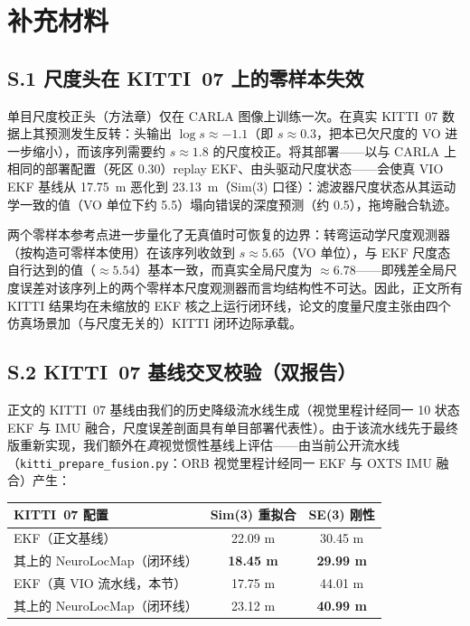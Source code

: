 
\section*{补充材料}
\label{sec:supplementary}

\subsection*{S.1 尺度头在 KITTI~07 上的零样本失效}

单目尺度校正头（方法章）仅在 CARLA 图像上训练一次。在真实 KITTI~07 数据上其预测发生反转：头输出 $\log s \approx -1.1$（即 $s\approx0.3$，把本已欠尺度的 VO 进一步缩小），而该序列需要约 $s\approx1.8$ 的尺度校正。将其部署——以与 CARLA 上相同的部署配置（死区 $0.30$）replay EKF、由头驱动尺度状态——会使真 VIO EKF 基线从 17.75~m 恶化到 23.13~m（Sim(3) 口径）：滤波器尺度状态从其运动学一致的值（VO 单位下约 5.5）塌向错误的深度预测（约 0.5），拖垮融合轨迹。

两个零样本参考点进一步量化了无真值时可恢复的边界：转弯运动学尺度观测器（按构造可零样本使用）在该序列收敛到 $s\approx5.65$（VO 单位），与 EKF 尺度态自行达到的值（$\approx5.54$）基本一致，而真实全局尺度为 $\approx6.78$——即残差全局尺度误差对该序列上的两个零样本尺度观测器而言均结构性不可达。因此，正文所有 KITTI 结果均在未缩放的 EKF 核之上运行闭环线，论文的度量尺度主张由四个仿真场景加（与尺度无关的）KITTI 闭环边际承载。

\subsection*{S.2 KITTI~07 基线交叉校验（双报告）}

正文的 KITTI~07 基线由我们的历史降级流水线生成（视觉里程计经同一 10 状态 EKF 与 IMU 融合，尺度误差剖面具有单目部署代表性）。由于该流水线先于最终版重新实现，我们额外在\emph{真}视觉惯性基线上评估——由当前公开流水线（\texttt{kitti\_prepare\_fusion.py}：ORB 视觉里程计经同一 EKF 与 OXTS IMU 融合）产生：

\begin{center}
\scriptsize
\setlength{\tabcolsep}{3.5pt}
\begin{tabular}{@{}lcc@{}}
\toprule
KITTI~07 配置 & Sim(3) 重拟合 & SE(3) 刚性 \\
\midrule
EKF（正文基线）          & 22.09 m & 30.45 m \\
其上的 NeuroLocMap（闭环线）     & \textbf{18.45 m} & \textbf{29.99 m} \\
\midrule
EKF（真 VIO 流水线，本节） & 17.75 m & 44.01 m \\
其上的 NeuroLocMap（闭环线）     & 23.12 m & \textbf{40.99 m} \\
\bottomrule
\end{tabular}
\end{center}

